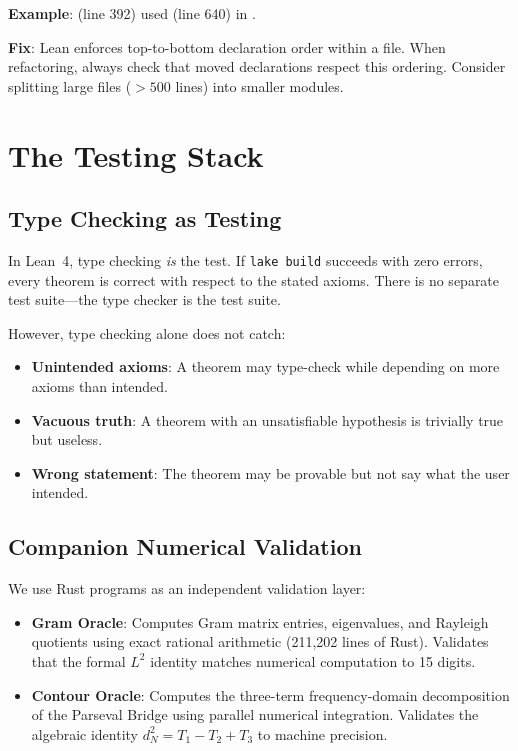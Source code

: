 \documentclass[11pt,a4paper]{article}
\begin{document}
\textbf{Example}:  (line 392) used
 (line 640) in
.

\textbf{Fix}: Lean enforces top-to-bottom declaration order within
a file. When refactoring, always check that moved declarations
respect this ordering. Consider splitting large files ($>500$ lines)
into smaller modules.

\section{The Testing Stack}
\label{sec:testing}

\subsection{Type Checking as Testing}

In Lean~4, type checking \emph{is} the test. If \texttt{lake build}
succeeds with zero errors, every theorem is correct with respect to
the stated axioms. There is no separate test suite---the type checker
is the test suite.

However, type checking alone does not catch:
\begin{itemize}
  \item \textbf{Unintended axioms}: A theorem may type-check while
    depending on more axioms than intended.
  \item \textbf{Vacuous truth}: A theorem with an unsatisfiable
    hypothesis is trivially true but useless.
  \item \textbf{Wrong statement}: The theorem may be provable but
    not say what the user intended.
\end{itemize}

\subsection{Companion Numerical Validation}

We use Rust programs as an independent validation layer:

\begin{itemize}
  \item \textbf{Gram Oracle}: Computes Gram matrix entries, eigenvalues,
    and Rayleigh quotients using exact rational arithmetic (211,202
    lines of Rust). Validates that the formal $L^2$ identity
    matches numerical computation to 15 digits.
  \item \textbf{Contour Oracle}: Computes the three-term frequency-domain
    decomposition of the Parseval Bridge using parallel numerical
    integration. Validates the algebraic identity
    $d_N^2 = T_1 - T_2 + T_3$ to machine precision.
\end{itemize}
\end{document}
